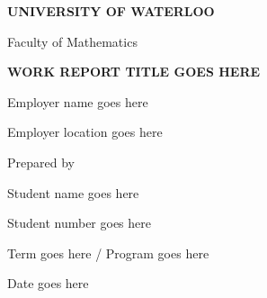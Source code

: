 
\begin{center}
	
	\textbf{UNIVERSITY OF WATERLOO}
		
	Faculty of Mathematics
		
	\vfill
		
	\textbf{WORK REPORT TITLE GOES HERE}
		
	\vfill
	
	Employer name goes here
	
	Employer location goes here
	
	\vfill
	
	Prepared by
	
	Student name goes here
	
	Student number goes here
	
	Term goes here / Program goes here
		
	Date goes here
	
	\newpage
\end{center}